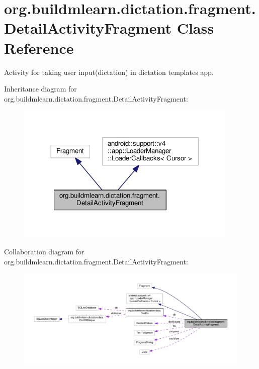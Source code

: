 \hypertarget{classorg_1_1buildmlearn_1_1dictation_1_1fragment_1_1DetailActivityFragment}{}\section{org.\+buildmlearn.\+dictation.\+fragment.\+Detail\+Activity\+Fragment Class Reference}
\label{classorg_1_1buildmlearn_1_1dictation_1_1fragment_1_1DetailActivityFragment}


Activity for taking user input(dictation) in dictation template\textquotesingle{}s app.  




Inheritance diagram for org.\+buildmlearn.\+dictation.\+fragment.\+Detail\+Activity\+Fragment\+:
\nopagebreak
\begin{figure}[H]
\begin{center}
\leavevmode
\includegraphics[width=300pt]{classorg_1_1buildmlearn_1_1dictation_1_1fragment_1_1DetailActivityFragment__inherit__graph}
\end{center}
\end{figure}


Collaboration diagram for org.\+buildmlearn.\+dictation.\+fragment.\+Detail\+Activity\+Fragment\+:
\nopagebreak
\begin{figure}[H]
\begin{center}
\leavevmode
\includegraphics[width=350pt]{classorg_1_1buildmlearn_1_1dictation_1_1fragment_1_1DetailActivityFragment__coll__graph}
\end{center}
\end{figure}
